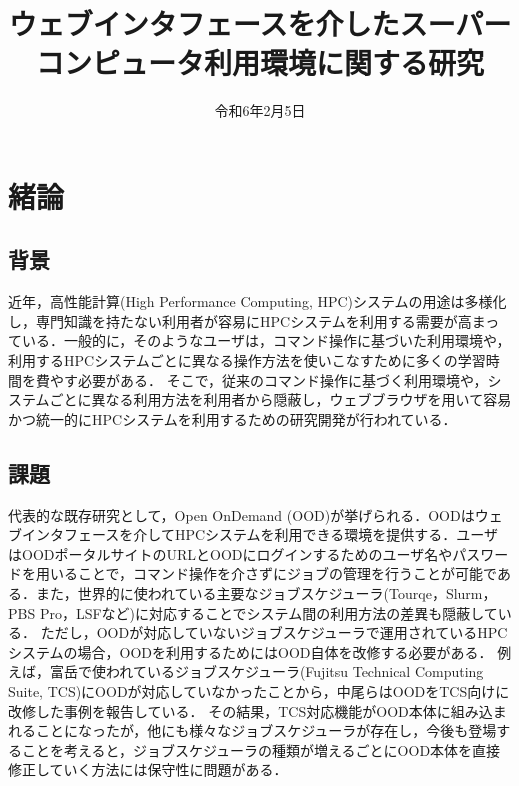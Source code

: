 \documentclass[a4paper,oneside,twocolumn,notitlepage,dvipdfmx]{jsarticle}
\date{令和6年2月5日}
\title{ウェブインタフェースを介したスーパーコンピュータ利用環境に関する研究}
\begin{document}
\maketitle
\section{緒論}
\subsection{背景}
近年，高性能計算(High Performance Computing, HPC)システムの用途は多様化し，専門知識を持たない利用者が容易にHPCシステムを利用する需要が高まっている．一般的に，そのようなユーザは，コマンド操作に基づいた利用環境や，利用するHPCシステムごとに異なる操作方法を使いこなすために多くの学習時間を費やす必要がある．
そこで，従来のコマンド操作に基づく利用環境や，システムごとに異なる利用方法を利用者から隠蔽し，ウェブブラウザを用いて容易かつ統一的にHPCシステムを利用するための研究開発が行われている．\par

\subsection{課題}
代表的な既存研究として，Open OnDemand (OOD)が挙げられる\cite{citation_2}．OODはウェブインタフェースを介してHPCシステムを利用できる環境を提供する．ユーザはOODポータルサイトのURLとOODにログインするためのユーザ名やパスワードを用いることで，コマンド操作を介さずにジョブの管理を行うことが可能である．また，世界的に使われている主要なジョブスケジューラ(Tourqe，Slurm，PBS Pro，LSFなど)に対応することでシステム間の利用方法の差異も隠蔽している．
ただし，OODが対応していないジョブスケジューラで運用されているHPCシステムの場合，OODを利用するためにはOOD自体を改修する必要がある．
例えば，富岳で使われているジョブスケジューラ(Fujitsu Technical Computing Suite, TCS)にOODが対応していなかったことから，中尾らはOODをTCS向けに改修した事例を報告している\cite{citation_1}．
その結果，TCS対応機能がOOD本体に組み込まれることになったが，他にも様々なジョブスケジューラが存在し，今後も登場することを考えると，ジョブスケジューラの種類が増えるごとにOOD本体を直接修正していく方法には保守性に問題がある．\par
\end{document}
